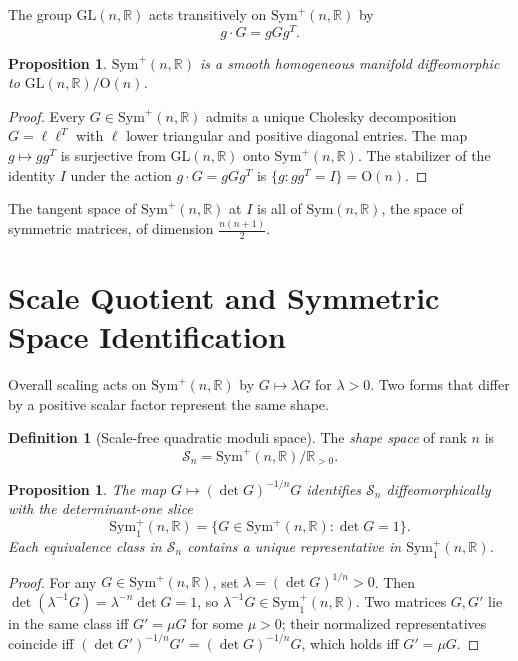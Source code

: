 \documentclass[12pt]{article}
\newtheorem{proposition}[theorem]{Proposition}
\theoremstyle{definition}
\newtheorem{definition}[theorem]{Definition}
\theoremstyle{remark}
\newcommand{\R}{\mathbb{R}}
\newcommand{\GL}{\mathrm{GL}}
\newcommand{\Sym}{\mathrm{Sym}}
\newcommand{\Symp}{\mathrm{Sym}^{+}}
\newcommand{\calM}{\mathcal{S}}
\begin{document}
The group $\GL(n,\R)$ acts transitively on $\Symp(n,\R)$ by
\[
  g \cdot G = g G g^T.
\]

\begin{proposition}
\label{prop:homogeneous}
$\Symp(n,\R)$ is a smooth homogeneous manifold diffeomorphic to
$\GL(n,\R)/\mathrm{O}(n)$.
\end{proposition}

\begin{proof}
Every $G \in \Symp(n,\R)$ admits a unique Cholesky decomposition
$G = \ell\ell^T$ with $\ell$ lower triangular and positive diagonal
entries.
The map $g \mapsto g g^T$ is surjective from $\GL(n,\R)$ onto
$\Symp(n,\R)$.
The stabilizer of the identity $I$ under the action
$g \cdot G = gGg^T$ is $\{g : gg^T = I\} = \mathrm{O}(n)$.
\end{proof}

The tangent space of $\Symp(n,\R)$ at $I$ is all of $\Sym(n,\R)$,
the space of symmetric matrices, of dimension $\frac{n(n+1)}{2}$.

\section{Scale Quotient and Symmetric Space Identification}
\label{sec:scale}

Overall scaling acts on $\Symp(n,\R)$ by $G \mapsto \lambda G$ for
$\lambda > 0$.
Two forms that differ by a positive scalar factor represent the same
shape.

\begin{definition}[Scale-free quadratic moduli space]
The \emph{shape space} of rank $n$ is
\[
  \calM_n = \Symp(n,\R)/\R_{>0}.
\]
\end{definition}

\begin{proposition}
\label{prop:det1slice}
The map $G \mapsto (\det G)^{-1/n} G$ identifies $\calM_n$
diffeomorphically with the determinant-one slice
\[
  \Symp_1(n,\R)
  = \{G \in \Symp(n,\R) : \det G = 1\}.
\]
Each equivalence class in $\calM_n$ contains a unique representative
in $\Symp_1(n,\R)$.
\end{proposition}

\begin{proof}
For any $G \in \Symp(n,\R)$, set $\lambda = (\det G)^{1/n} > 0$.
Then $\det(\lambda^{-1} G) = \lambda^{-n} \det G = 1$, so
$\lambda^{-1} G \in \Symp_1(n,\R)$.
Two matrices $G, G'$ lie in the same class iff $G' = \mu G$ for some
$\mu > 0$; their normalized representatives coincide iff
$(\det G')^{-1/n} G' = (\det G)^{-1/n} G$, which holds iff $G' = \mu G$.
\end{proof}
\end{document}
